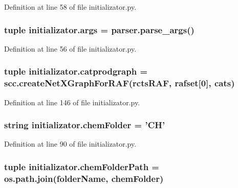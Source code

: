 Definition at line 58 of file initializator.\-py.

\hypertarget{a00135_aedb2e5b77a354ccd69d9d38b3c30f61a}{
\subsubsection[{args}]{\setlength{\rightskip}{0pt plus 5cm}tuple initializator.\-args = parser.\-parse\-\_\-args()}}\label{a00135_aedb2e5b77a354ccd69d9d38b3c30f61a}


Definition at line 56 of file initializator.\-py.

\hypertarget{a00135_ae879083e010a0e2af0a12a7d953a6e8b}{
\subsubsection[{catprodgraph}]{\setlength{\rightskip}{0pt plus 5cm}tuple initializator.\-catprodgraph = scc.\-create\-Net\-X\-Graph\-For\-R\-A\-F({\bf rcts\-R\-A\-F}, {\bf rafset}\mbox{[}0\mbox{]}, cats)}}\label{a00135_ae879083e010a0e2af0a12a7d953a6e8b}


Definition at line 146 of file initializator.\-py.

\hypertarget{a00135_a4a57e1e8a830824b985f34ee1af52b93}{
\subsubsection[{chem\-Folder}]{\setlength{\rightskip}{0pt plus 5cm}string initializator.\-chem\-Folder = 'C\-H'}}\label{a00135_a4a57e1e8a830824b985f34ee1af52b93}


Definition at line 90 of file initializator.\-py.

\hypertarget{a00135_a633d7089af5a033807ccba3b7e9ad483}{
\subsubsection[{chem\-Folder\-Path}]{\setlength{\rightskip}{0pt plus 5cm}tuple initializator.\-chem\-Folder\-Path = os.\-path.\-join({\bf folder\-Name}, {\bf chem\-Folder})}}\label{a00135_a633d7089af5a033807ccba3b7e9ad483}


